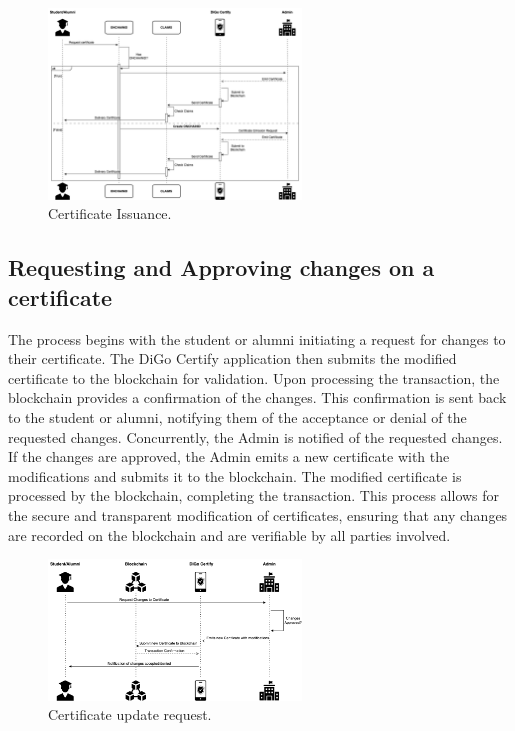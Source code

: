\begin{figure}[H]
    \centering
    \includegraphics[width=0.6\textwidth]{../diagrams/certificate-request-diagram-sequence.png}
    \caption{Certificate Issuance.}
    \label{fig:certificate-issuance}
\end{figure}

\subsection{Requesting and Approving changes on a certificate}

The process begins with the student or alumni initiating a request for changes to their certificate. The DiGo Certify application then submits the modified certificate to the blockchain for validation. Upon processing the transaction, the blockchain provides a confirmation of the changes. This confirmation is sent back to the student or alumni, notifying them of the acceptance or denial of the requested changes. Concurrently, the Admin is notified of the requested changes. If the changes are approved, the Admin emits a new certificate with the modifications and submits it to the blockchain. The modified certificate is processed by the blockchain, completing the transaction. This process allows for the secure and transparent modification of certificates, ensuring that any changes are recorded on the blockchain and are verifiable by all parties involved.

\begin{figure}[H]
    \centering
    \includegraphics[width=0.6\textwidth]{../diagrams/certificate-update-diagram-sequence.png}
    \caption{Certificate update request.}
    \label{fig:certificate-update}
\end{figure}


